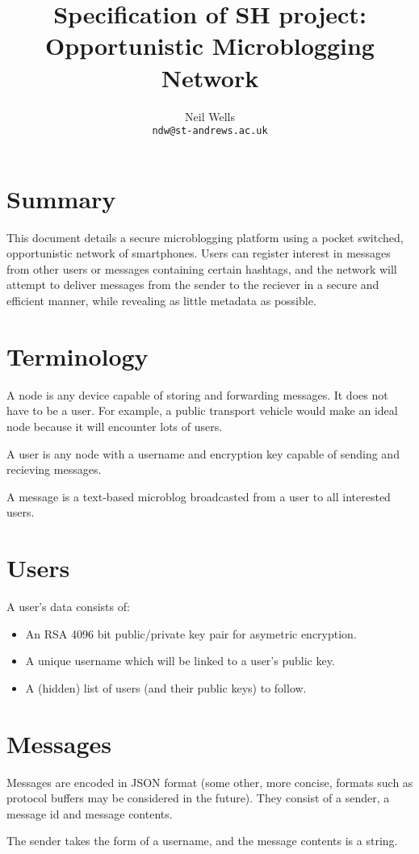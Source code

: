 \documentclass{article}
\title{\textbf{Specification of SH project: Opportunistic Microblogging Network}}
\author{Neil Wells\\
\texttt{ndw@st-andrews.ac.uk}}
\date{}
\begin{document}
\maketitle

\section*{Summary}
This document details a secure microblogging platform using a pocket switched, opportunistic network of smartphones. Users can register interest in messages from other users or messages containing certain hashtags, and the network will attempt to deliver messages from the sender to the reciever in a secure and efficient manner, while revealing as little metadata as possible.


\section*{Terminology}
A node is any device capable of storing and forwarding messages. It does not have to be a user. For example, a public transport vehicle would make an ideal node because it will encounter lots of users.

A user is any node with a username and encryption key capable of sending and recieving messages.

A message is a text-based microblog broadcasted from a user to all interested users.

\section*{Users}
A user's data consists of:
\begin{itemize}
\item An RSA 4096 bit public/private key pair for asymetric encryption.
\item A unique username which will be linked to a user's public key.
\item A (hidden) list of users (and their public keys) to follow.
\end{itemize}

\section*{Messages}
Messages are encoded in JSON format (some other, more concise, formats such as protocol buffers may be considered in the future). They consist of a sender, a message id and message contents.

The sender takes the form of a username, and the message contents is a string.
\end{document}
